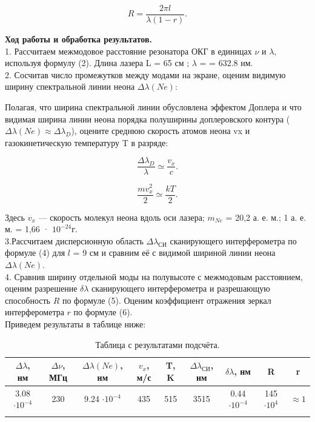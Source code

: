\documentclass[a4paper, 12pt]{article}%
\begin{document}
	\begin{equation}
		R = \frac{2 \pi l}{\lambda(1 - r)}.
	\end{equation}
	
	\newpage 
	
	
	
	
	
	\textbf{Ход работы и обработка результатов.}\\
	
1.	Рассчитаем межмодовое расстояние резонатора ОКГ в единицах $\nu$ и
	$\lambda$, используя формулу (2). Длина лазера L = 65 см ; $\lambda$ =
	= $632.8 $ нм.\\
	
	
2. Сосчитав число промежутков между модами на экране, оценим видимую ширину спектральной линии неона $\Delta\lambda(Ne)$:


Полагая, что ширина спектральной линии обусловлена эффектом
Доплера и что видимая ширина линии неона порядка полуширины доплеровского контура ($\Delta\lambda(Ne) \approx \Delta\lambda_D$), оцените среднюю скорость атомов неона vx и газокинетическую температуру T в разряде:


\begin{equation}
	\frac{\Delta\lambda_D}{\lambda} \simeq \frac{v_x}{c}.
\end{equation}

\begin{equation}
	\frac{mv_x^2}{2} \simeq \frac{kT}{2}.
\end{equation}

Здесь $v_x$ — скорость молекул неона вдоль оси лазера; $m_{Ne}$ = 20,2 а. е. м.;
1 а. е. м. = 1,66 · $10^{-24} $г.\\


3.Рассчитаем дисперсионную область $\Delta \lambda_\text{СИ}$ сканирующего интерферометра по формуле (4) для $l$ = 9 см и сравним её с видимой шириной
линии неона $\Delta\lambda(Ne)$.\\

4. Сравнив ширину отдельной моды на полувысоте с межмодовым расстоянием, оценим разрешение $\delta\lambda$ сканирующего интерферометра и разрешающую способность $R$ по формуле (5).
Оценим коэффициент отражения зеркал интерферометра $r$ по формуле (6).\\

Приведем результаты в таблице ниже:

	\begin{longtable}{|c|c|c|c|c|c|c|c|c|}
		\hline
		$\Delta\lambda$, нм& $\Delta\nu$, МГц&  $\Delta\lambda(Ne)$, нм& $v_x$, м/с& T, K& $\Delta \lambda_\text{СИ}$, нм&$\delta\lambda$, нм& R&r \\ \hline
		3.08 $\cdot 10 ^{-4}$ &  230 & 9.24 $\cdot 10 ^{-4}$&  435 &  515 & 3515& 0.44 $\cdot 10 ^{-4}$ & 145 $\cdot 10 ^{4}$& $\approx 1$ \\ \hline
		
		\caption{Таблица с результатами подсчёта.}
	\end{longtable}
	
\end{document}
